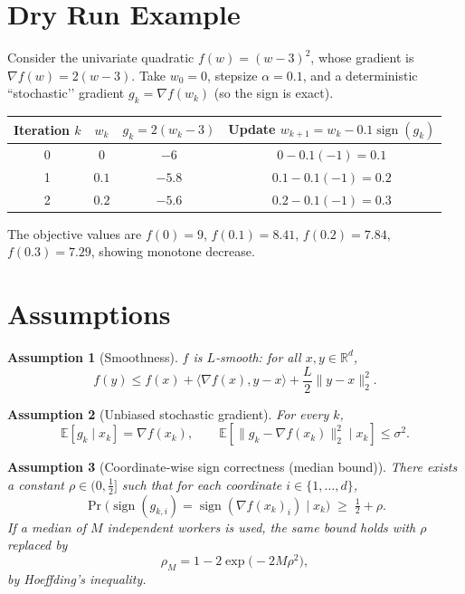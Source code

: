 \documentclass{article}
\newtheorem{assumption}{Assumption}
\newcommand{\sign}{\operatorname{sign}}
\newcommand{\E}{\mathbb{E}}
\newcommand{\R}{\mathbb{R}}
\begin{document}
\section*{Dry Run Example}
Consider the univariate quadratic $f(w)=(w-3)^{2}$, whose gradient is $\nabla f(w)=2(w-3)$.  
Take $w_{0}=0$, stepsize $\alpha=0.1$, and a deterministic “stochastic’’ gradient $g_{k}= \nabla f(w_{k})$ (so the sign is exact).

\begin{tabular}{c|c|c|c}
Iteration $k$ & $w_{k}$ & $g_{k}=2(w_{k}-3)$ & Update $w_{k+1}=w_{k}-0.1\sign(g_{k})$ \\ \hline
0 & $0$ & $-6$ & $0-0.1(-1)=0.1$ \\
1 & $0.1$ & $-5.8$ & $0.1-0.1(-1)=0.2$ \\
2 & $0.2$ & $-5.6$ & $0.2-0.1(-1)=0.3$ \\
\end{tabular}

The objective values are $f(0)=9$, $f(0.1)=8.41$, $f(0.2)=7.84$, $f(0.3)=7.29$, showing monotone decrease.

\newpage

\section*{Assumptions}
\begin{assumption}[Smoothness]\label{ass:smooth}
$f$ is $L$‑smooth: for all $x,y\in\R^{d}$,
\[
f(y)\le f(x)+\langle\nabla f(x),y-x\rangle+\frac{L}{2}\|y-x\|_{2}^{2}.
\]
\end{assumption}

\begin{assumption}[Unbiased stochastic gradient]\label{ass:unbiased}
For every $k$,
\[
\E\!\left[g_k\mid x_k\right]=\nabla f(x_k),\qquad
\E\!\left[\|g_k-\nabla f(x_k)\|_{2}^{2}\mid x_k\right]\le\sigma^{2}.
\]
\end{assumption}

\begin{assumption}[Coordinate‑wise sign correctness (median bound)]\label{ass:sign}
There exists a constant $\rho\in(0,\tfrac12]$ such that for each coordinate $i\in\{1,\dots,d\}$,
\[
\Pr\!\bigl(\sign(g_{k,i})=\sign(\nabla f(x_k)_i)\mid x_k\bigr)\;\ge\;\tfrac12+\rho .
\tag{1}
\]
If a median of $M$ independent workers is used, the same bound holds with $\rho$ replaced by
\[
\rho_M=1-2\exp\!\bigl(-2M\rho^{2}\bigr),
\]
by Hoeffding’s inequality.
\end{assumption}
\end{document}
